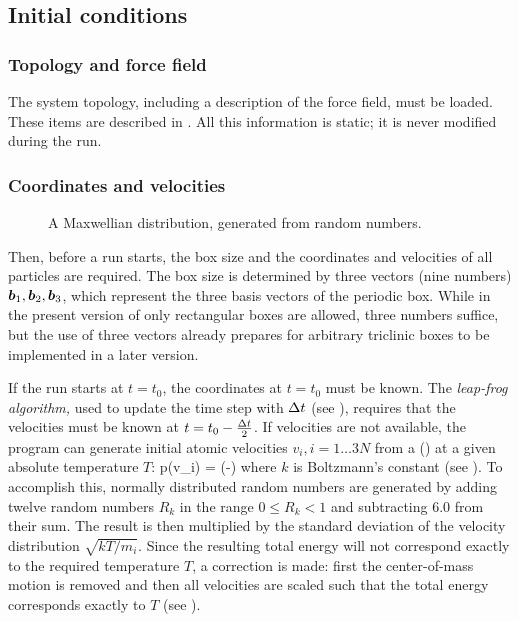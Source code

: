 \subsection{Initial conditions}
\subsubsection*{Topology and force field}
The system topology, including a description of the force field, must
be loaded. These items are described in .
All this information is static; it is never modified during the run.

\subsubsection*{Coordinates and velocities}
\begin{figure}
\centerline{}
\caption{A Maxwellian distribution, generated from random numbers.}
\label{fig:maxwell}
\end{figure}

Then, before a run starts, the box size and the coordinates and
velocities of  all particles are required. The box size is determined
by three vectors (nine numbers) $\mbox{\boldmath ${b}$}_1, \mbox{\boldmath ${b}$}_2, \mbox{\boldmath ${b}$}_3$, which
represent the three basis vectors of the periodic box. While in the
present version of {\gromacs} only rectangular boxes are allowed, three
numbers  suffice, but the use of three vectors already
prepares for arbitrary triclinic boxes to be implemented in a later
version. 

If the run starts at $t=t_0$, the coordinates at $t=t_0$ must be
known. The {\em leap-frog algorithm,} used to update the time step
with ${\Delta t}$ (see ), requires that the velocities must
be known at $t=t_0 - {\frac {\Delta t}{2}}$. If velocities are not available, the
program can generate initial atomic velocities $v_i, i=1\ldots 3N$
from a  () at a
given absolute temperature $T$:
\beq 
p(v_i) = \exp(-)
\eeq
where $k$ is Boltzmann's constant (see ).
To accomplish this, normally distributed random numbers are generated
by adding twelve random numbers $R_k$ in the range $0 \le R_k < 1$ and
subtracting 6.0 from their sum. The result is then multiplied by the
standard deviation of the velocity distribution $\sqrt{kT/m_i}$. Since
the resulting total energy will not correspond exactly to the required
temperature $T$, a correction is made: first the center-of-mass motion
is removed and then all velocities are scaled such that the total
energy corresponds exactly to $T$ (see ).

